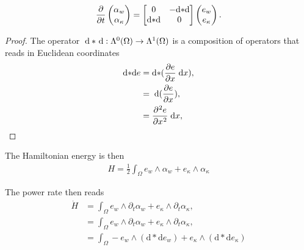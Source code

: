 \documentclass{article}
\newtheorem{proof}{Proof}
\begin{document}
\begin{equation}\label{eq:pHsysEB_diff}
\diffp{}{t}\begin{pmatrix}
\alpha_w \\ \alpha_\kappa \\
\end{pmatrix} = \begin{bmatrix}
0 & -\mathrm{d}{*}\mathrm{d}\\
\mathrm{d}{*}\mathrm{d} & 0 \\
\end{bmatrix} \begin{pmatrix}
e_w \\ e_\kappa \\
\end{pmatrix}.
\end{equation}
\begin{proof}
	The operator $\d * \d : \Lambda^0(\Omega) \rightarrow \Lambda^1(\Omega)$ is a composition of operators that reads in Euclidean coordinates
	\begin{equation}
		\begin{aligned}
		\mathrm{d}{*}\mathrm{d} e &= \mathrm{d}{*} (\diffp{e}{x} \d{x}), \\
		         &= \d (\diffp{e}{x}), \\
		         &= \diffp[2]{e}{x} \d{x}, \\
		\end{aligned}
	\end{equation}
\end{proof}
The Hamiltonian energy is then 
\begin{equation}
\begin{aligned}
H = \frac{1}{2}  \int_{\Omega} e_w \wedge \alpha_w   + e_\kappa \wedge \alpha_\kappa
\end{aligned}
\end{equation}

The power rate then reads 
\begin{equation}
\begin{aligned}
\dot{H} &= \int_{\Omega} e_w \wedge \partial_t \alpha_w   + e_\kappa \wedge \partial_t \alpha_\kappa, \\
&= \int_{\Omega} e_w \wedge \partial_t \alpha_w   + e_\kappa \wedge \partial_t \alpha_\kappa, \\
&=\int_{\Omega} -e_w \wedge (\mathrm{d}{*}\mathrm{d} e_w)   + e_\kappa \wedge (\mathrm{d}{*}\mathrm{d} e_\kappa)
\end{aligned}
\end{equation}
\end{document}
